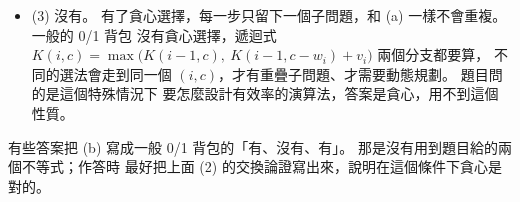\begin{pastsoln}
\begin{itemize}
於是演算法是：依 $k, k - 1, \ldots$ 的順序拿，第一個放不下的時候停（後面的更重，也放不下）。
$O(k)$ 時間。 換個角度看：最多能放 $t$ 個物品，而最輕的 $t$ 個正好也是最值錢的 $t$ 個。
\item (3) 沒有。 有了貪心選擇，每一步只留下一個子問題，和 (a) 一樣不會重複。 一般的 0/1 背包
沒有貪心選擇，遞迴式 $K(i, c) = \max\bigl(K(i - 1, c),\ K(i - 1, c - w_i) + v_i\bigr)$ 兩個分支都要算，
不同的選法會走到同一個 $(i, c)$，才有重疊子問題、才需要動態規劃。 題目問的是這個特殊情況下
要怎麼設計有效率的演算法，答案是貪心，用不到這個性質。
\end{itemize}

有些答案把 (b) 寫成一般 0/1 背包的「有、沒有、有」。 那是沒有用到題目給的兩個不等式；作答時
最好把上面 (2) 的交換論證寫出來，說明在這個條件下貪心是對的。
\end{pastsoln}
